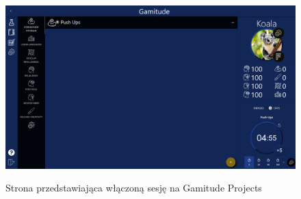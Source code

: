 \documentclass[a4paper,11pt]{report}
\begin{document}
\begin{figure}[H]
	\centering
	\includegraphics[scale=0.3]{prezentacja/Projects_session}\\
	\caption{Strona przedstawiająca włączoną sesję na Gamitude Projects}
	\label{fig:Projects_session}
\end{figure}
\end{document}
